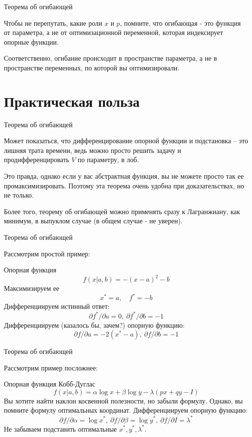 \documentclass{beamer}
\begin{document}
\begin{frame}{Теорема об огибающей}

Чтобы не перепутать, какие роли $x$ и $p$, помните, что \alert{огибающая - это функция от параметра}, а не от оптимизационной переменной, которая индексирует опорные функции. 

Соответственно, \alert{огибание происходит в пространстве параметра, а не в пространстве переменных, по которой вы оптимизировали}.

\end{frame}

\section{Практическая польза}

\begin{frame}{Теорема об огибающей}

Может показаться, что дифференцирование опорной функции и подстановка – это лишняя трата времени, ведь можно просто решить задачу и продифференцировать $V$ по параметру, в лоб.

Это правда, однако если у вас абстрактная функция, вы не можете просто так ее промаксимизировать. Поэтому эта теорема очень удобна при доказательствах, но не только. 

Более того, теорему об огибающей можно применять сразу к Лагранжиану, как минимум, в выпуклом случае (в общем случае - не уверен).

\end{frame}

\begin{frame}{Теорема об огибающей}

Рассмотрим простой пример:

Опорная функция $$ f(x|a,b) = - (x-a)^2 - b $$
Максимизируем ее $$ x^{\ast} = a, \quad f^{\ast} = - b $$
Дифференциируем истинный ответ: $$\partial f^{\ast}/\partial a = 0, \ \partial f^{\ast}/\partial b = -1$$
Дифференциируем (казалось бы, зачем?) опорную функцию: $$\partial f/\partial a = -2(x^{\ast}-a), \ \partial f/\partial b = -1$$
\end{frame}

\begin{frame}{Теорема об огибающей}

Рассмотрим пример посложнее:

Опорная функция Кобб-Дуглас $$ f(x|a,b) = \alpha \log x + \beta \log y - \lambda (px + qy - I) $$
Вы хотите найти наклон косвенной полезности, но забыли формулу. Однако, вы помните формулу оптимальных координат.
Дифференциируем опорную функцию: $$\partial f/\partial \alpha = \log x^{\ast}, \ \partial f/\partial \beta = \log y^{\ast}, \ \partial f/\partial I = \lambda^{\ast}$$
Не забываем подставить оптимальные $x^{\ast}, y^{\ast}, \lambda^{\ast}$.
\end{frame}
\end{document}
